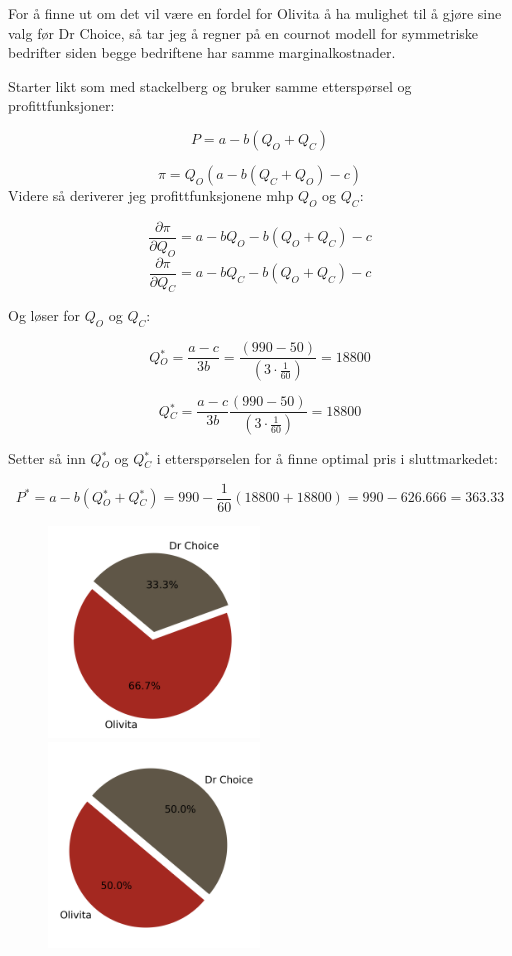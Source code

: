 \documentclass[
  12pt,
  a4paper,
  DIV=11,
  numbers=noendperiod]{scrartcl}
\begin{document}
For å finne ut om det vil være en fordel for Olivita å ha mulighet til å
gjøre sine valg før Dr Choice, så tar jeg å regner på en cournot modell
for symmetriske bedrifter siden begge bedriftene har samme
marginalkostnader.

Starter likt som med stackelberg og bruker samme etterspørsel og
profittfunksjoner:

\[P = a - b(Q_O+Q_C) \tag{10}\]

\[\pi = Q_O(a-b(Q_C+Q_O)-c) \tag{11}\] Videre så deriverer jeg
profittfunksjonene mhp \(Q_O\) og \(Q_C\):

\[\frac{\partial \pi}{\partial Q_O} = a -b Q_O - b(Q_O+Q_C) -c \tag{12}\]
\[\frac{\partial \pi}{\partial Q_C} = a -b Q_C - b(Q_O+Q_C) -c \tag{13}\]

Og løser for \(Q_O\) og \(Q_C\):

\[Q{_O^*} = \frac{a-c}{3b} = \frac{(990-50)}{(3 \cdot \frac{1}{60})} = 18800 \tag{14}\]

\[Q{_C^*} = \frac{a-c}{3b} \frac{(990-50)}{(3 \cdot \frac{1}{60})} = 18800 \tag{15}\]

Setter så inn \(Q{_O^*}\) og \(Q{_C^*}\) i etterspørselen for å finne
optimal pris i sluttmarkedet:

\[P^* = a - b(Q{_O^*}+Q{_C^*}) = 990 - \frac{1}{60}(18800+18800) = 990 - 626.666 = 363.33 \tag{16}\]

\begin{figure}
  \centering
  \includegraphics[width=0.5\textwidth]{dokumentobjekter/figurer/stackelberg_olivita_dr_choice.png}
  \label{fig:stackel_olivita_dr_choice}
  \includegraphics[width=0.5\textwidth]{dokumentobjekter/figurer/cournot_olivita_dr_choice.png}
  \label{fig:cournot_olivita_dr_choice}
  \vspace{-1cm}
\end{figure}
\end{document}
